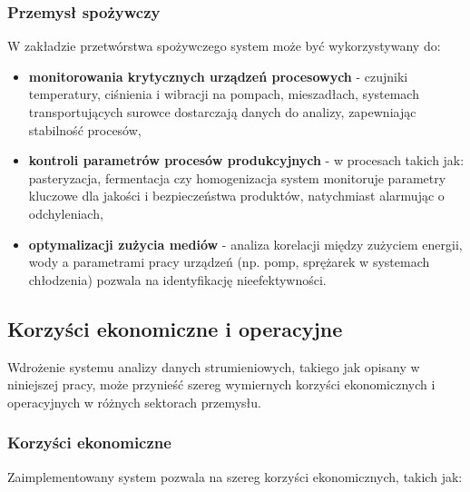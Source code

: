 \subsubsection{Przemysł spożywczy}
\label{subsubsec:przemysl_spozywczy}

W zakładzie przetwórstwa spożywczego system może być wykorzystywany do:

\vspace{0.3em}

\begin{itemize}
    \item \textbf{monitorowania krytycznych urządzeń procesowych} - czujniki temperatury, ciśnienia i wibracji na pompach, mieszadłach, systemach transportujących surowce dostarczają danych do analizy, zapewniając stabilność procesów,
    \item \textbf{kontroli parametrów procesów produkcyjnych} - w procesach takich jak: pasteryzacja, fermentacja czy homogenizacja system monitoruje parametry kluczowe dla jakości i bezpieczeństwa produktów, natychmiast alarmując o odchyleniach,
    \item \textbf{optymalizacji zużycia mediów} - analiza korelacji między zużyciem energii, wody a parametrami pracy urządzeń (np. pomp, sprężarek w systemach chłodzenia) pozwala na identyfikację nieefektywności.
\end{itemize}

\subsection{Korzyści ekonomiczne i operacyjne}
\label{subsec:korzysci}

Wdrożenie systemu analizy danych strumieniowych, takiego jak opisany w niniejszej pracy, może przynieść szereg wymiernych korzyści ekonomicznych i operacyjnych w różnych sektorach przemysłu.

\subsubsection{Korzyści ekonomiczne}
\label{subsubsec:korzysci_ekonomiczne}

Zaimplementowany system pozwala na szereg korzyści ekonomicznych, takich jak:

\vspace{0.3em}

